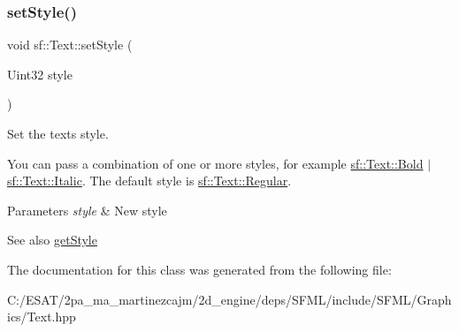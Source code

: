 \subsubsection{\texorpdfstring{set\+Style()}{setStyle()}}
{\footnotesize\ttfamily void sf\+::\+Text\+::set\+Style (\begin{DoxyParamCaption}\item[{Uint32}]{style }\end{DoxyParamCaption})}



Set the text\textquotesingle{}s style. 

You can pass a combination of one or more styles, for example \hyperlink{classsf_1_1_text_aa8add4aef484c6e6b20faff07452bd82af1b47f98fb1e10509ba930a596987171}{sf\+::\+Text\+::\+Bold} $\vert$ \hyperlink{classsf_1_1_text_aa8add4aef484c6e6b20faff07452bd82aee249eb803848723c542c2062ebe69d8}{sf\+::\+Text\+::\+Italic}. The default style is \hyperlink{classsf_1_1_text_aa8add4aef484c6e6b20faff07452bd82a2af9ae5e1cda126570f744448e0caa32}{sf\+::\+Text\+::\+Regular}.


\begin{DoxyParams}{Parameters}
{\em style} & New style\\
\hline
\end{DoxyParams}
\begin{DoxySeeAlso}{See also}
\hyperlink{classsf_1_1_text_a0da79b0c057f4bb51592465a205c35d7}{get\+Style} 
\end{DoxySeeAlso}


The documentation for this class was generated from the following file\+:\begin{DoxyCompactItemize}
\item 
C\+:/\+E\+S\+A\+T/2pa\+\_\+ma\+\_\+martinezcajm/2d\+\_\+engine/deps/\+S\+F\+M\+L/include/\+S\+F\+M\+L/\+Graphics/Text.\+hpp\end{DoxyCompactItemize}
